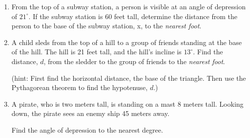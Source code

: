 \begin{enumerate}
\item From the top of a subway station, a person is visible at an angle of depression of $21^\circ$. If the subway station is 60 feet tall, determine the distance from the person to the base of the subway station, x, to the \emph{nearest foot}.
\begin{flushright}
  \end{flushright} \vspace{1.5cm}

\item A child sleds from the top of a hill to a group of friends standing at the base of the hill. The hill is 21 feet tall, and the hill's incline is $13^\circ$. Find the distance, $d$, from the sledder to the group of friends to the \emph{nearest foot}.

(hint: First find the horizontal distance, the base of the triangle. Then use the Pythagorean theorem to find the hypotenuse, $d$.)
\begin{flushright}
\end{flushright}\vspace{4cm}

\newpage
\item A pirate, who is two meters tall, is standing on a mast 8 meters tall. Looking down, the pirate sees an enemy ship 45 meters away.

  Find the angle of depression to the nearest degree.
  \begin{center}
    \end{center} \vspace{4cm}
    

\end{enumerate}
